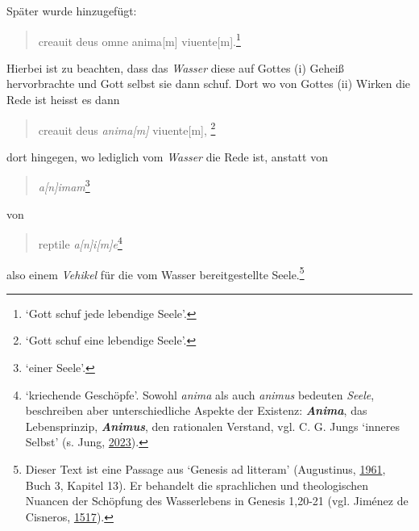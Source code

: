 \documentclass[
]{article}
\begin{document}
Später wurde hinzugefügt:

\begin{quote}
creauit deus omne anima{[}m{]} viuente{[}m{]}.\footnote{`Gott schuf jede
  lebendige Seele'.}
\end{quote}

Hierbei ist zu beachten, dass das \emph{Wasser} diese auf Gottes (i)
Geheiß hervorbrachte und Gott selbst sie dann schuf. Dort wo von Gottes
(ii) Wirken die Rede ist heisst es dann

\begin{quote}
creauit deus \emph{anima{[}m{]}} viuente{[}m{]}, \footnote{`Gott schuf
  eine lebendige Seele'.}
\end{quote}

dort hingegen, wo lediglich vom \emph{Wasser} die Rede ist, anstatt von

\begin{quote}
\emph{a{[}n{]}imam}\footnote{`einer Seele'.}
\end{quote}

von

\begin{quote}
reptile \emph{a{[}n{]}i{[}m{]}e}\footnote{`kriechende Geschöpfe'. Sowohl
  \emph{anima} als auch \emph{animus} bedeuten \emph{Seele}, beschreiben
  aber unterschiedliche Aspekte der Existenz: \textbf{\emph{Anima}}, das
  Lebensprinzip, \textbf{\emph{Animus}}, den rationalen Verstand, vgl.
  C. G. Jungs `inneres Selbst' (s. Jung,
  \href{https://books.google.com/books?id=cX3VEAAAQBAJ}{2023}).}
\end{quote}

also einem \emph{Vehikel} für die vom Wasser bereitgestellte
Seele.\footnote{Dieser Text ist eine Passage aus `Genesis ad litteram'
  (Augustinus,
  \href{https://mdz-nbn-resolving.de/details:bsb00046071}{1961}, Buch 3,
  Kapitel 13). Er behandelt die sprachlichen und theologischen Nuancen
  der Schöpfung des Wasserlebens in Genesis 1,20-21 (vgl. Jiménez de
  Cisneros, \href{https://doi.org/10.3931/e-rara-46695}{1517}).}
\end{document}
